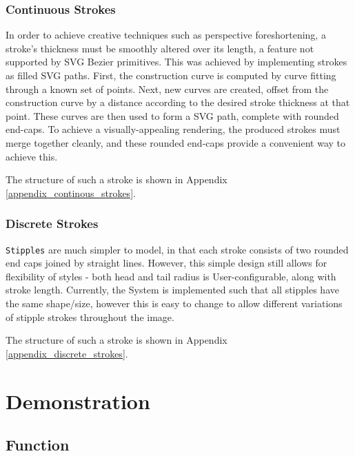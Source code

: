 {\subsubsection{Continuous Strokes}

In order to achieve creative techniques such as perspective foreshortening, a stroke’s thickness must be smoothly altered over its length, a feature not supported by SVG Bezier primitives. 
This was achieved by implementing strokes as filled SVG paths.
First, the construction curve is computed by curve fitting through a known set of points.
Next, new curves are created, offset from the construction curve by a distance according to the desired stroke thickness at that point.
These curves are then used to form a SVG path, complete with rounded end-caps.
To achieve a visually-appealing rendering, the produced strokes must merge together cleanly, and these rounded end-caps provide a convenient way to achieve this.

The structure of such a stroke is shown in Appendix \ref{appendix_continous_strokes}.

\subsubsection{Discrete Strokes}

\texttt{Stipples} are much simpler to model, in that each stroke consists of two rounded end caps joined by straight lines.
However, this simple design still allows for flexibility of styles - both head and tail radius is User-configurable, along with stroke length.
Currently, the System is implemented such that all stipples have the same shape/size, however this is easy to change to allow different variations of stipple strokes throughout the image.

The structure of such a stroke is shown in Appendix \ref{appendix_discrete_strokes}.

\newpage
\section{Demonstration}

\subsection{Function}

}
